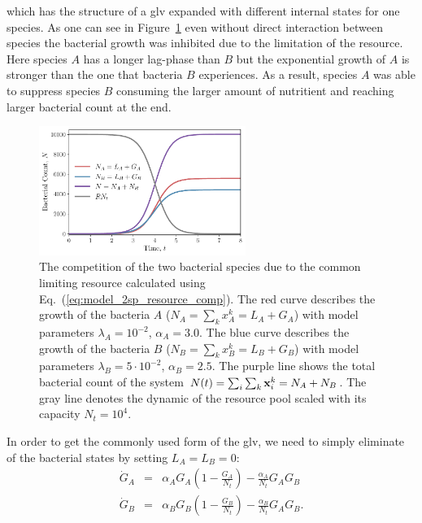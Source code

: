 \documentclass[10pt,A4paper]{article}
\begin{document}
which has the structure of a \ac{glv} expanded with different internal states for one species.
As one can see in Figure~\ref{fig:2pool_resource_2sp} even without direct interaction between species the bacterial growth was inhibited due to the limitation of the resource.
Here species $A$ has a longer lag-phase than $B$ but the exponential growth of $A$ is stronger than the one that bacteria $B$ experiences.
As a result, species $A$ was able to suppress species $B$ consuming the larger amount of nutritient and reaching larger bacterial count at the end.
\begin{figure}[H]
    \begin{center}
    \includegraphics[width=0.6\textwidth]{Figures/pool_model_2pools_resource_competition.pdf}
    \caption{
        The competition of the two bacterial species due to the common limiting resource calculated using Eq.~(\ref{eq:model_2sp_resource_comp}).
        The red curve describes the growth of the bacteria $A$ ($N_A = \sum_{k} x_A^k = L_A+G_A$) with model parameters $\lambda_A=10^{-2}$, $\alpha_A=3.0$.
        The blue curve describes the growth of the bacteria $B$ ($N_B = \sum_{k} x_B^k = L_B+G_B$) with model parameters $\lambda_B=5\cdot 10^{-2}$, $\alpha_B=2.5$.
        The purple line shows the total bacterial count of the system  $N(t)=\sum_i\sum_k\mathbf{x}_i^k=N_A+N_B$.
        The gray line denotes the dynamic of the resource pool scaled with its capacity $N_t=10^4$.
    }
    \label{fig:2pool_resource_2sp}
    \end{center}
\end{figure}
%
In order to get the commonly used form of the \ac{glv}, we need to simply eliminate of the bacterial states by setting $L_A=L_B=0$: 
\begin{eqnarray}
    \dot{G}_A &=& \alpha_A G_A\left(1 - \frac{G_A}{N_t}\right) - \frac{\alpha_A}{N_t}G_AG_B
    \label{eq:LV_simple1}\\
    \dot{G}_B &=& \alpha_B G_B\left(1-\frac{G_B}{N_t}\right) -\frac{\alpha_B}{N_t}G_AG_B. 
    \label{eq:LV_simple2}
\end{eqnarray} 
\end{document}
